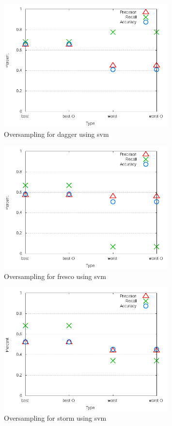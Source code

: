 \begin{figure}[!ht]
    \centering
        \includegraphics[width=0.8\textwidth]{images/svm/test_4/dagger_sample_range}
        \caption{Oversampling for dagger using \gls{svm}}
        \label{fig:test_4_dagger_svm}
\end{figure}

\begin{figure}[!ht]
    \centering
        \includegraphics[width=0.8\textwidth]{images/svm/test_4/fresco_sample_range}
        \caption{Oversampling for fresco using \gls{svm}}
        \label{fig:test_4_fresco_svm}
\end{figure}

\begin{figure}[!ht]
    \centering
        \includegraphics[width=0.8\textwidth]{images/svm/test_4/storm_sample_range}
        \caption{Oversampling for storm using \gls{svm}}
        \label{fig:test_4_storm_svm}
\end{figure}

